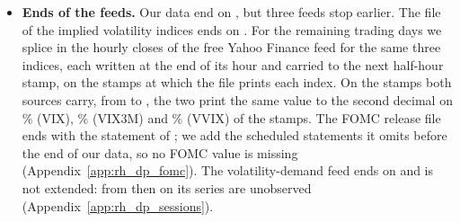 \begin{itemize}
\item \textbf{Ends of the feeds.} Our data end on \rhdsSampleEnd, but three feeds stop earlier. The file of the implied
  volatility indices ends on \rhdsVixVendorLast. For the remaining \rhdsVixSpliceDays{} trading days we splice in the
  hourly closes of the free Yahoo Finance feed for the same three indices, each written at the end of its hour and
  carried to the next half-hour stamp, on the stamps at which the file prints each index. On the stamps both sources
  carry, from \rhdsVixOverlapStart{} to \rhdsVixVendorLast, the two print the same value to the second decimal on
  \rhdsVixAgree\% (VIX), \rhdsVixThreeMAgree\% (VIX3M) and \rhdsVvixAgree\% (VVIX) of the stamps. The FOMC release
  file ends with the statement of \rhdsFomcFileLast; we add the \rhdsFomcAdded{} scheduled statements it omits before
  the end of our data, so no FOMC value is missing (Appendix~\ref{app:rh_dp_fomc}). The volatility-demand feed ends on
  \rhdsVdLast{} and is not extended: from then on its \bkSizeVd{} series are unobserved
  (Appendix~\ref{app:rh_dp_sessions}).
\end{itemize}

